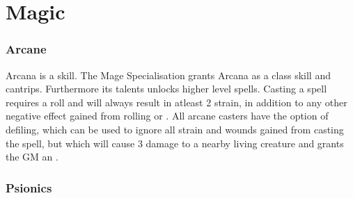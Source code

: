 \chapter{Magic}
\setcounter{unbalance}{30}
\begin{multicols}{2}

\subsection{Arcane}
Arcana is a skill. The Mage Specialisation grants Arcana as a class skill and cantrips. Furthermore its talents unlocks higher level spells. Casting a spell
requires a roll and will always result in atleast 2 strain, in addition to any other negative effect gained from rolling \threat or \despair. All arcane
casters have the option of defiling, which can be used to ignore all strain and wounds gained from casting the spell, but which will cause 3 damage to a
nearby living creature and grants the GM an \dark.

\subsection{Psionics}

\end{multicols}
